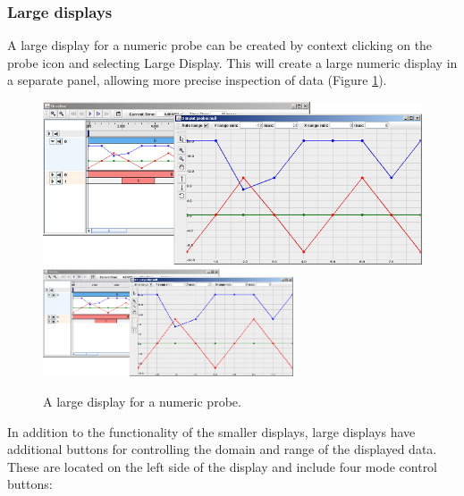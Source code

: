 \documentclass{article}
\begin{document}
\subsubsection{Large displays}

A large display for a numeric probe can be created by context clicking
on the probe icon and selecting {\sf Large Display}. This will create a
large numeric display in a separate panel, allowing more precise
inspection of data (Figure \ref{largeDisplayFig}).

\begin{figure}
\begin{center}
\iflatexml
\includegraphics[]{images/largeDisplay}
\else
\includegraphics[width=0.66\textwidth]{images/largeDisplay}
\fi
\end{center}
\caption{A large display for a numeric probe.}%
\label{largeDisplayFig}
\end{figure}

In addition to the functionality of the smaller displays, large
displays have additional buttons for controlling the domain
and range of the displayed data. These are located on the left side
of the display and include four mode control buttons:
\end{document}
